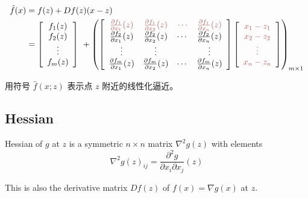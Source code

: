 \begin{definition}
    $$\begin{aligned}
        \hat{f} (x) & =f(z)+Df(z)(x-z)\\
         & =\left[\begin{array}{ c }
        f_{1} (z)\\
        f_{2} (z)\\
        \vdots \\
        f_{m} (z)
        \end{array}\right] \ +\left(\left[\begin{array}{ c c c c }
        \textcolor[rgb]{0.72,0.33,0.31}{\frac{\partial f_{1}}{\partial x_{1}} (z)} & \textcolor[rgb]{0.72,0.33,0.31}{\frac{\partial f_{1}}{\partial x_{2}} (z)} & \textcolor[rgb]{0.72,0.33,0.31}{\cdots } & \textcolor[rgb]{0.72,0.33,0.31}{\frac{\partial f_{1}}{\partial x_{n}} (z)}\\
        \frac{\partial f_{2}}{\partial x_{1}} (z) & \frac{\partial f_{2}}{\partial x_{2}} (z) & \cdots  & \frac{\partial f_{2}}{\partial x_{n}} (z)\\
        \vdots  & \vdots  &  & \vdots \\
        \frac{\partial f_{m}}{\partial x_{1}} (z) & \frac{\partial f_{m}}{\partial x_{2}} (z) & \cdots  & \frac{\partial f_{m}}{\partial x_{n}} (z)
        \end{array}\right]\left[\begin{array}{ c }
        \textcolor[rgb]{0.72,0.33,0.31}{x_{1} -z_{1}}\\
        \textcolor[rgb]{0.72,0.33,0.31}{x_{2} -z_{2}}\\
        \textcolor[rgb]{0.72,0.33,0.31}{\vdots }\\
        \textcolor[rgb]{0.72,0.33,0.31}{x_{n} -z_{n}}
        \end{array}\right]\right)_{m\times 1}
        \end{aligned}$$

    用符号 $ \hat{f}(x ; z) $ 表示点 $ z $ 附近的线性化逼近。
\end{definition}

\subsection{Hessian}

\begin{definition}
    Hessian of $ g $ at $ z $ is a symmetric $ n \times n $ matrix $ \nabla^{2} g(z) $ with elements
$$
\nabla^{2} g(z)_{i j}=\frac{\partial^{2} g}{\partial x_{i} \partial x_{j}}(z)
$$

This is also the derivative matrix $ D f(z) $ of $ f(x)=\nabla g(x) $ at $ z $.
\end{definition}

